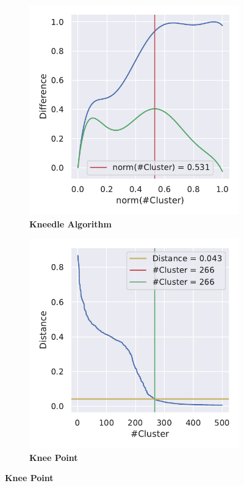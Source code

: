 \begin{figure}[!hbt]
    \centering
    \begin{subfigure}[b]{0.475\textwidth}
        \caption[Kneedle Algorithm]{\textbf{Kneedle Algorithm}}
        \label{subfig:UMAP_Cluster_Knee_Kneedle_4}            \includegraphics[width=\textwidth]{UMAP/Cluster_Knee_Segment_4.pdf}
    \end{subfigure}
    \hfill
    \begin{subfigure}[b]{0.475\textwidth}
        \caption[Knee Point]{\textbf{Knee Point}}
        \label{subfig:UMAP_Cluster_Knee_Elbow_4}            \includegraphics[width=\textwidth]{UMAP/Cluster_Elbow_Knee_Segment_4.pdf}

\end{subfigure}
\end{figure}
